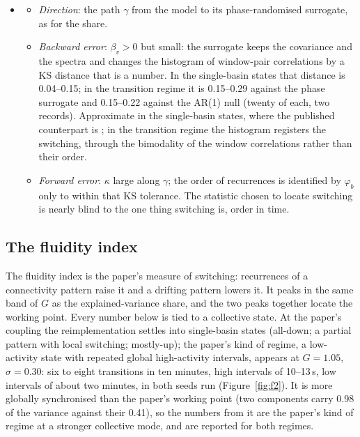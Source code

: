 \documentclass[11pt]{article}
\begin{document}
\begin{itemize}
\begin{itemize}
  \item \emph{Forward error}: $\kappa$ large along the stationary direction; along the regime coordinate the field's evidence is thin and divided.
  \end{itemize}
\item[$\Theta_3$]
  \begin{itemize}
  \item \emph{Direction}: the path $\gamma$ from the model to its phase-randomised surrogate, as for the share.
  \item \emph{Backward error}: $\beta_v>0$ but small: the surrogate keeps the covariance and the spectra and changes the histogram of window-pair correlations by a KS distance that is a number. In the single-basin states that distance is 0.04--0.15; in the transition regime it is 0.15--0.29 against the phase surrogate and 0.15--0.22 against the AR(1) null (twenty of each, two records). Approximate in the single-basin states, where the published counterpart is \textcite{liegeois2017}; in the transition regime the histogram registers the switching, through the bimodality of the window correlations rather than their order.
  \item \emph{Forward error}: $\kappa$ large along $\gamma$; the order of recurrences is identified by $\varphi_b$ only to within that KS tolerance. The statistic chosen to locate switching is nearly blind to the one thing switching is, order in time.
  \end{itemize}
\end{itemize}

\subsection{The fluidity index}
The fluidity index is the paper's measure of switching: recurrences of a connectivity pattern raise it and a drifting pattern lowers it. It peaks in the same band of $G$ as the explained-variance share, and the two peaks together locate the working point. Every number below is tied to a collective state. At the paper's coupling the reimplementation settles into single-basin states (all-down; a partial pattern with local switching; mostly-up); the paper's kind of regime, a low-activity state with repeated global high-activity intervals, appears at $G=1.05$, $\sigma=0.30$: six to eight transitions in ten minutes, high intervals of 10--13\,s, low intervals of about two minutes, in both seeds run (Figure~\ref{fig:f2}). It is more globally synchronised than the paper's working point (two components carry 0.98 of the variance against their 0.41), so the numbers from it are the paper's kind of regime at a stronger collective mode, and are reported for both regimes.
\end{document}
